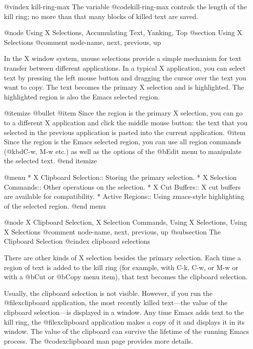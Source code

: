 {{{{@vindex kill-ring-max
  The variable @code{kill-ring-max} controls the length of the kill
ring; no more than that many blocks of killed text are saved.

@node Using X Selections, Accumulating Text, Yanking, Top
@section Using X Selections
@comment  node-name,  next,  previous,  up

In the X window system, mouse selections provide a simple mechanism for
text transfer between different applications.  In a typical X
application, you can select text by pressing the left mouse button and
dragging the cursor over the text you want to copy. The text becomes the
primary X selection and is highlighted. The highlighted region is also
the Emacs selected region.

@itemize @bullet
@item
Since the region is the primary X selection, you can go to a
different X application and click the middle mouse button: the text that
you selected in the previous application is pasted into the current
application.
@item
Since the region is the Emacs selected region, you can use all region
commands (@kbd{C-w, M-w} etc.) as well as the options of the @b{Edit}
menu to manipulate the selected text.
@end itemize

@menu
* X Clipboard Selection::     	Storing the primary selection.
* X Selection Commands::	Other operations on the selection.
* X Cut Buffers::       	X cut buffers are available for compatibility.
* Active Regions::      	Using zmacs-style highlighting of the
                        	 selected region.
@end menu

@node X Clipboard Selection, X Selection Commands, Using X Selections, Using X Selections
@comment  node-name,  next,  previous,  up
@subsection The Clipboard Selection
@cindex clipboard selections

There are other kinds of X selection besides the primary selection.  Each
time a region of text is added to the kill ring (for example, with C-k,
C-w, or M-w or with a @b{Cut} or @b{Copy} menu item), that text becomes
the clipboard selection.

Usually, the clipboard selection is not visible. However, if you run
the @file{xclipboard} application, the most recently killed text---the
value of the clipboard selection---is displayed in a window.
Any time Emacs adds text to the kill ring, the @file{xclipboard}
application makes a copy of it and displays it in its window. The
value of the clipboard can survive the lifetime of the running Emacs
process. The @code{xclipboard} man page provides more details.

}}}}
